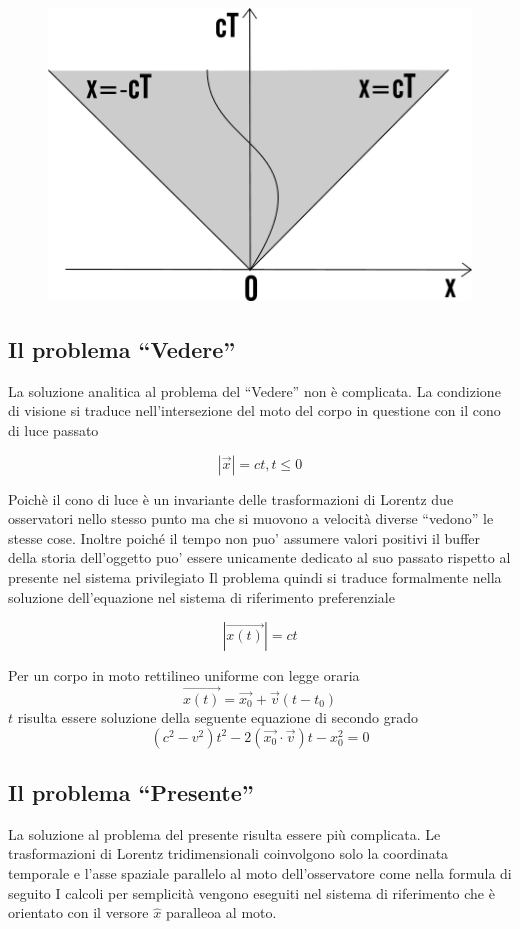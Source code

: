\documentclass{report}
\begin{document}
\begin{figure}[h]
\includegraphics[width = .7\textwidth]{mink.png}
\end{figure}

\subsection{Il problema ``Vedere''}

La soluzione analitica al problema del “Vedere” non è complicata.
La condizione di visione si traduce nell’intersezione del moto del corpo in questione con il cono di luce passato

$$ | \vec{x}| = ct ,   t\leq 0 $$

Poichè il cono di luce è un invariante delle trasformazioni di Lorentz due osservatori nello stesso punto ma che
si muovono a velocità diverse “vedono” le stesse cose.
Inoltre poiché il tempo non puo’ assumere valori positivi il buffer della storia dell’oggetto puo’ essere unicamente
dedicato al suo passato rispetto al presente nel sistema privilegiato
Il problema quindi si traduce formalmente nella soluzione dell’equazione nel sistema di riferimento preferenziale

$$ | \vec{x(t)}| = ct $$

Per un corpo in moto rettilineo uniforme con legge oraria
$$  \vec{x(t)} = \vec{x_0} + \vec{v}(t-t_0)$$
$t$ risulta essere soluzione della seguente equazione di secondo grado
$$ (c^2-v^2)t^2-2(\vec{x_0} \cdot \vec{v}) t-x_0^2 =0 $$


\subsection{Il problema ``Presente''}
La soluzione al problema del presente risulta essere più complicata.
Le trasformazioni di Lorentz tridimensionali coinvolgono solo la coordinata temporale e l’asse spaziale parallelo
al moto dell’osservatore come nella formula di seguito
I calcoli per semplicità vengono eseguiti nel sistema di riferimento che è orientato con il versore $\hat{x}$ paralleoa al moto.
\end{document}
